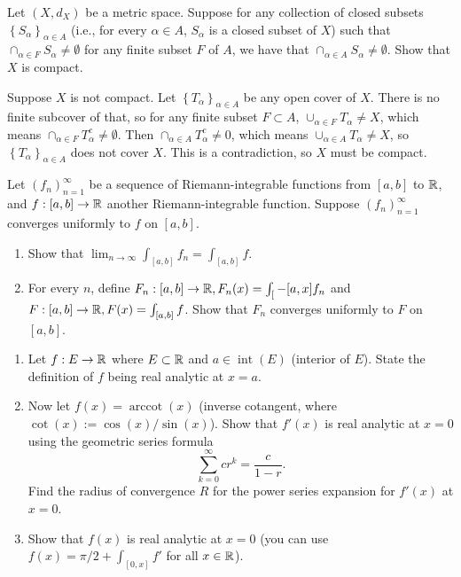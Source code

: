 \documentclass{article}
\begin{document}
\bigskip
\begin{prob}
    Let $(X, d_X)$ be a metric space. Suppose for any collection of closed subsets $ \left\{ S_\alpha \right\}_{\alpha \in A}$ (i.e., for every $\alpha \in A$, $S_\alpha$ is a closed subset of $X$) such that $\cap_{\alpha \in F} S_\alpha \neq \emptyset$ for any finite subset $F$ of $A$, we have that $\cap_{\alpha \in A} S_\alpha \neq \emptyset$. Show that $X$ is compact.
\end{prob}
Suppose $X$ is not compact. Let $ \left\{ T_\alpha \right\}_{\alpha \in A}$ be any open cover of $X$. There is no finite subcover of that, so for any finite subset $F \subset A$, $ \cup_{\alpha \in F} T_\alpha \neq X$, which means $\cap_{\alpha \in F} T_\alpha^c \neq \emptyset$. Then $\cap_{\alpha \in A} T_\alpha^c \neq 0$, which means $ \cup_{\alpha \in A} T_\alpha \neq X$, so $ \left\{ T_\alpha \right\}_{\alpha \in A}$ does not cover $X$. This is a contradiction, so $X$ must be compact.

\bigskip
\begin{prob}
    Let $(f_n)_{n=1}^\infty$ be a sequence of Riemann-integrable functions from $[a,b]$ to $\mathbb{R}$, and $f: [a,b] \rightarrow \mathbb{R}$ another Riemann-integrable function. Suppose $(f_n)_{n=1}^\infty$ converges uniformly to $f$ on $[a,b]$.
    \begin{enumerate}[label=(\alph*)]
        \item Show that $\lim_{n \rightarrow \infty} \int_{[a,b]} f_n = \int_{[a,b]} f$.
        \item For every $n$, define $F_n : [a,b] \rightarrow \mathbb{R}, F_n(x) = \int_[-{[a,x]} f_n$ and $F: [a,b] \rightarrow \mathbb{R}, F(x) = \int_{[a,b]} f$. Show that $F_n$ converges uniformly to $F$ on $[a,b]$.
    \end{enumerate}
\end{prob}

\bigskip
\begin{prob}
    \begin{enumerate}[label=(\alph*)]
        \item Let $f: E \rightarrow \mathbb{R}$ where $E \subset \mathbb{R}$ and $a \in \operatorname{int}(E)$ (interior of $E$). State the definition of $f$ being real analytic at $x=a$.
        \item Now let $f(x) = \operatorname{arccot}(x)$ (inverse cotangent, where $\cot(x) := \cos(x)/\sin(x)$). Show that $f'(x)$ is real analytic at $x=0$ using the geometric series formula
            \[ \sum_{k=0}^\infty cr^k = \frac{c}{1-r}. \]
            Find the radius of convergence $R$ for the power series expansion for $f'(x)$ at $x=0$.
        \item Show that $f(x)$ is real analytic at $x=0$ (you can use $f(x) = \pi/2 + \int_{[0,x]} f'$ for all $x \in \mathbb{R}$).
    \end{enumerate}
\end{prob}
\end{document}
